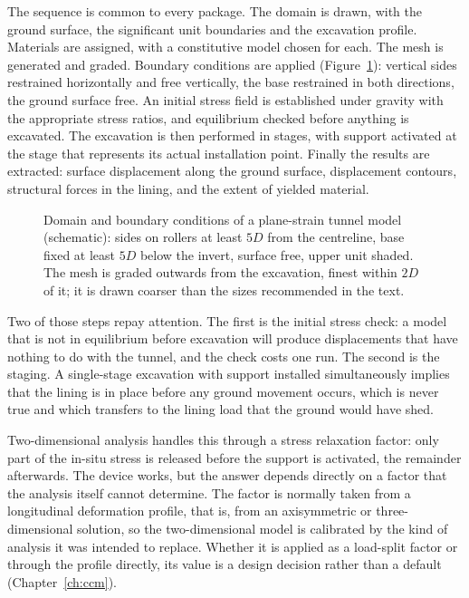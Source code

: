 The sequence is common to every package. The domain is drawn, with the ground
surface, the significant unit boundaries and the excavation profile. Materials
are assigned, with a constitutive model chosen for each. The mesh is generated
and graded. Boundary conditions are applied
(Figure~\ref{fig:model-domain}): vertical sides restrained
horizontally and free vertically, the base restrained in both directions, the
ground surface free. An initial stress field is established under gravity with
the appropriate stress ratios, and equilibrium checked before anything is
excavated. The excavation is then performed in stages, with support activated
at the stage that represents its actual installation point. Finally the results
are extracted: surface displacement along the ground surface, displacement
contours, structural forces in the lining, and the extent of yielded material.

\begin{figure}[htbp]
\centering
{}
\caption{Domain and boundary conditions of a plane-strain tunnel model (schematic): sides on rollers at least $5D$ from the centreline, base fixed at least $5D$ below the invert, surface free, upper unit shaded. The mesh is graded outwards from the excavation, finest within $2D$ of it; it is drawn coarser than the sizes recommended in the text.}
\label{fig:model-domain}
\end{figure}

Two of those steps repay attention. The first is the initial stress check: a
model that is not in equilibrium before excavation will produce displacements
that have nothing to do with the tunnel, and the check costs one run. The
second is the staging. A single-stage excavation with support installed
simultaneously implies that the lining is in place before any ground movement
occurs, which is never true and which transfers to the lining load that the
ground would have shed.

Two-dimensional analysis handles this through a stress relaxation factor:
only part of the in-situ stress is released before the support is activated,
the remainder afterwards. The device works, but the answer depends directly on
a factor that the analysis itself cannot determine. The factor is normally
taken from a longitudinal deformation profile, that is, from an axisymmetric or
three-dimensional solution, so the two-dimensional model is calibrated by
the kind of analysis it was intended to replace.
Whether it is applied as a load-split factor or through the profile directly,
its value is a design decision rather than a default (Chapter~\ref{ch:ccm}).

